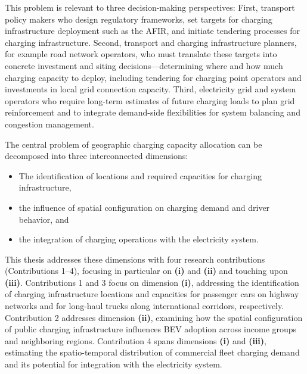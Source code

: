 This problem is relevant to three decision-making perspectives: First, transport policy makers who design regulatory frameworks, set targets for charging infrastructure deployment such as the AFIR, and initiate tendering processes for charging infrastructure. Second, transport and charging infrastructure planners, for example road network operators, who must translate these targets into concrete investment and siting decisions—determining where and how much charging capacity to deploy, including tendering for charging point operators and investments in local grid connection capacity. Third, electricity grid and system operators who require long-term estimates of future charging loads to plan grid reinforcement and to integrate demand-side flexibilities for system balancing and congestion management.

The central problem of geographic charging capacity allocation can be decomposed into three interconnected dimensions:


\begin{itemize}
    \item[\textbf{(i)}] The identification of locations and required capacities for charging infrastructure,
    \item[\textbf{(ii)}] the influence of spatial configuration on charging demand and driver behavior, and
    \item[\textbf{(iii)}] the integration of charging operations with the electricity system.
\end{itemize}

This thesis addresses these dimensions with four research contributions (Contributions 1--4), focusing in particular on \textbf{(i)} and \textbf{(ii)} and touching upon \textbf{(iii)}. Contributions 1 and 3 focus on dimension \textbf{(i)}, addressing the identification of charging infrastructure locations and capacities for passenger cars on highway networks and for long-haul trucks along international corridors, respectively. Contribution 2 addresses dimension \textbf{(ii)}, examining how the spatial configuration of public charging infrastructure influences \ac{BEV} adoption across income groups and neighboring regions. Contribution 4 spans dimensions \textbf{(i)} and \textbf{(iii)}, estimating the spatio-temporal distribution of commercial fleet charging demand and its potential for integration with the electricity system.

